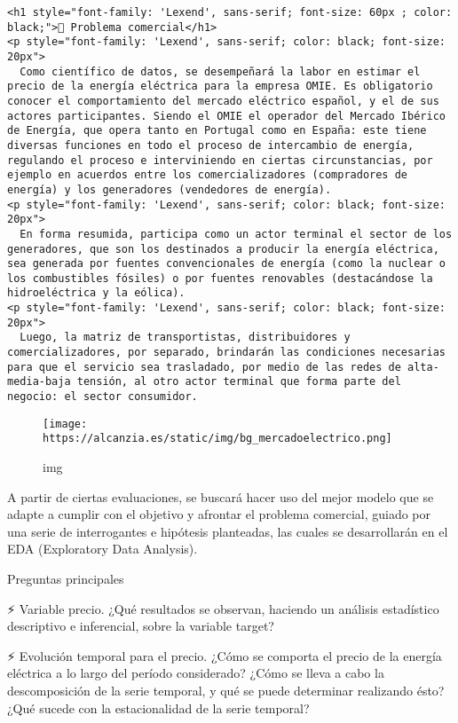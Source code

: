 \documentclass[11pt]{article}
\begin{document}
\begin{verbatim}
<h1 style="font-family: 'Lexend', sans-serif; font-size: 60px ; color: black;">💭 Problema comercial</h1>
<p style="font-family: 'Lexend', sans-serif; color: black; font-size: 20px">
  Como científico de datos, se desempeñará la labor en estimar el precio de la energía eléctrica para la empresa OMIE. Es obligatorio conocer el comportamiento del mercado eléctrico español, y el de sus actores participantes. Siendo el OMIE el operador del Mercado Ibérico de Energía, que opera tanto en Portugal como en España: este tiene diversas funciones en todo el proceso de intercambio de energía, regulando el proceso e interviniendo en ciertas circunstancias, por ejemplo en acuerdos entre los comercializadores (compradores de energía) y los generadores (vendedores de energía).
<p style="font-family: 'Lexend', sans-serif; color: black; font-size: 20px">
  En forma resumida, participa como un actor terminal el sector de los generadores, que son los destinados a producir la energía eléctrica, sea generada por fuentes convencionales de energía (como la nuclear o los combustibles fósiles) o por fuentes renovables (destacándose la hidroeléctrica y la eólica).
<p style="font-family: 'Lexend', sans-serif; color: black; font-size: 20px">
  Luego, la matriz de transportistas, distribuidores y comercializadores, por separado, brindarán las condiciones necesarias para que el servicio sea trasladado, por medio de las redes de alta-media-baja tensión, al otro actor terminal que forma parte del negocio: el sector consumidor.
\end{verbatim}

\begin{figure}
\centering
\texttt{[image: https://alcanzia.es/static/img/bg\_mercadoelectrico.png]}
\caption{img}
\end{figure}

A partir de ciertas evaluaciones, se buscará hacer uso del mejor modelo
que se adapte a cumplir con el objetivo y afrontar el problema
comercial, guiado por una serie de interrogantes e hipótesis planteadas,
las cuales se desarrollarán en el EDA (Exploratory Data Analysis).

Preguntas principales

⚡ Variable precio. ¿Qué resultados se observan, haciendo un análisis
estadístico descriptivo e inferencial, sobre la variable target?

⚡ Evolución temporal para el precio. ¿Cómo se comporta el precio de la
energía eléctrica a lo largo del período considerado? ¿Cómo se lleva a
cabo la descomposición de la serie temporal, y qué se puede determinar
realizando ésto? ¿Qué sucede con la estacionalidad de la serie temporal?
\end{document}

